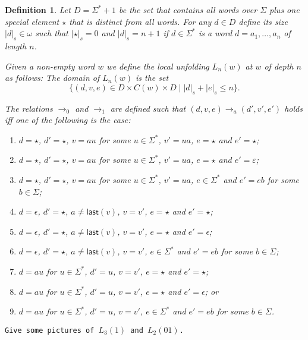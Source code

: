 \documentclass[a4paper]{article}
\newcommand{\size}[1]{{|{#1}|_s}}
\newcommand{\last}[1]{\mathsf{last}({#1})}
\newtheorem{definition}[theorem]{Definition}
\begin{document}
\begin{definition}
 Let $D = \Sigma^* + 1$ be the set that contains all words over $\Sigma$
plus one special element $\star$ that is distinct from all words. For
any $d \in D$ define its size $\size{d} \in \omega$ such that
$\size{\star} = 0$ and $\size{d} = n + 1$ if $d \in \Sigma^*$ is a word
$d = a_1, \dots, a_n$ of length $n$.


 Given a non-empty word $w$ we define the \emph{local unfolding}
$L_n(w)$ at $w$ of depth $n$ as follows: The domain of $L_n(w)$ is the
set
\[
 \{(d,v,e) \in D \times C(w) \times D \mid \size{d} + \size{e} \leq n\}.
\]

The relations $\rightarrow_0$ and $\rightarrow_1$ are defined such that
$(d,v,e) \rightarrow_a (d',v',e')$ holds iff one of the following is the
case:
\begin{enumerate}
 \item $d = \star$, $d' = \star$, $v = a u$ for some $u \in \Sigma^*$,
$v' = u a$, $e = \star$ and $e' = \star$;
 \item $d = \star$, $d' = \star$, $v = a u$ for some $u \in \Sigma^*$,
$v' = u a$, $e = \star$ and $e' = \varepsilon$;
 \item $d = \star$, $d' = \star$, $v = a u$ for some $u \in \Sigma^*$,
$v' = u a$, $e \in \Sigma^*$ and $e' = e b$ for some $b \in \Sigma$;
 \item $d = \epsilon$, $d' = \star$, $a \neq \last{v}$, $v = v'$, $e =
\star$ and $e' = \star$;
 \item $d = \epsilon$, $d' = \star$, $a \neq \last{v}$, $v = v'$, $e =
\star$ and $e' = \epsilon$;
 \item $d = \epsilon$, $d' = \star$, $a \neq \last{v}$, $v = v'$, $e \in
\Sigma^*$ and $e' = e b$ for some $b \in \Sigma$;
 \item $d = a u$ for $u \in \Sigma^*$, $d' = u$, $v = v'$, $e = \star$
and $e' = \star$;
 \item $d = a u$ for $u \in \Sigma^*$, $d' = u$, $v = v'$, $e = \star$
and $e' = \epsilon$; or
 \item $d = a u$ for $u \in \Sigma^*$, $d' = u$, $v = v'$, $e \in
\Sigma^*$ and $e' = e b$ for some $b \in \Sigma$.
\end{enumerate}
\end{definition}

\texttt{Give some pictures of $L_3(1)$ and $L_2(01)$.}
\end{document}
